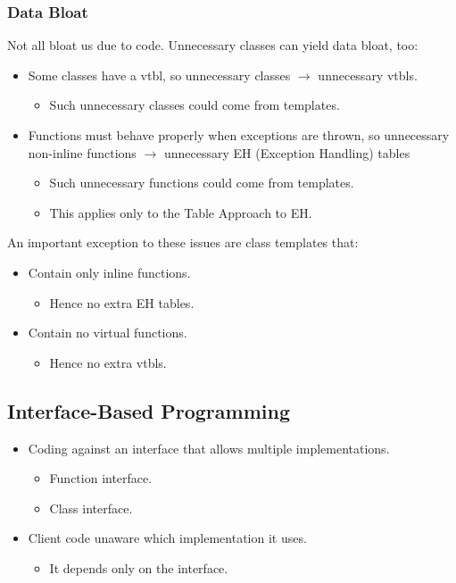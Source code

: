 \subsubsection{Data Bloat}
Not all bloat us due to code. Unnecessary classes can yield data bloat, too:
\begin{itemize}
  \item Some classes have a vtbl, so unnecessary classes $\rightarrow$ unnecessary vtbls.
  \begin{itemize}
    \item Such unnecessary classes could come from templates.
  \end{itemize}
  \item Functions must behave properly when exceptions are thrown, so unnecessary non-inline functions $\rightarrow$ unnecessary EH (Exception Handling) tables
  \begin{itemize}
    \item Such unnecessary functions could come from templates.
    \item This applies only to the Table Approach to EH.
  \end{itemize}
\end{itemize}
An important exception to these issues are class templates that:
\begin{itemize}
  \item Contain only inline functions.
  \begin{itemize}
    \item Hence no extra EH tables.
  \end{itemize}
  \item Contain no virtual functions.
  \begin{itemize}
    \item Hence no extra vtbls.
  \end{itemize}
\end{itemize}

\subsection{Interface-Based Programming}

\begin{itemize}
  \item Coding against an interface that allows multiple implementations.
  \begin{itemize}
    \item Function interface.
    \item Class interface.
  \end{itemize}
  \item Client code unaware which implementation it uses.
  \begin{itemize}
    \item It depends only on the interface.
  \end{itemize}
\end{itemize}


